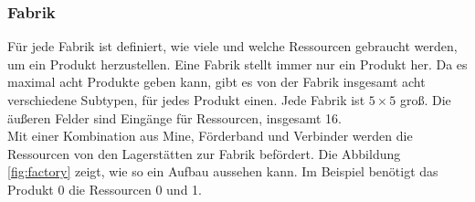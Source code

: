 \subsubsection*{Fabrik}
Für jede Fabrik ist definiert, wie viele und welche Ressourcen gebraucht werden, um ein Produkt herzustellen. Eine Fabrik stellt immer nur ein Produkt her. Da es maximal acht Produkte geben kann, gibt es von der Fabrik insgesamt acht verschiedene Subtypen, für jedes Produkt einen. Jede Fabrik ist $5\times5$ groß. Die äußeren Felder sind Eingänge für Ressourcen, insgesamt 16.
\\
Mit einer Kombination aus Mine, Förderband und Verbinder werden die Ressourcen von den Lagerstätten zur Fabrik befördert. Die Abbildung \ref{fig:factory} zeigt, wie so ein Aufbau aussehen kann. Im Beispiel benötigt das Produkt 0 die Ressourcen 0 und 1.
\newpage
